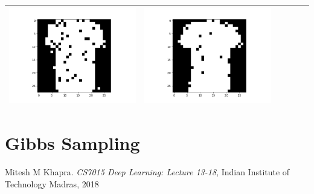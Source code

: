 \documentclass[12pt]{report}
\begin{document}
\begin{table}[H]
\begin{tabular}{ | c | c | c | c | c | c |}
\begin{minipage}{.3\textwidth}
      \includegraphics[scale=0.2]{BM_a16.png}
    \end{minipage} &
    \begin{minipage}{.3\textwidth}
      \includegraphics[scale=0.2]{BM_a40.png}
    \end{minipage}
    \\ \hline
  \end{tabular}
\end{table}

\section{Gibbs Sampling}


\begin{thebibliography}{9}
Mitesh M Khapra. \textit{CS7015 Deep Learning: Lecture 13-18}, 
Indian Institute of Technology Madras, 2018
\end{thebibliography}
\end{document}
